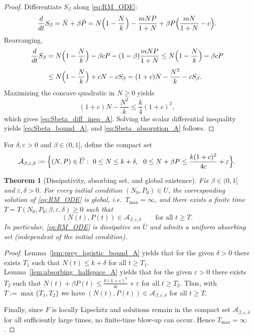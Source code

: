 \documentclass[pdflatex,sn-mathphys-ay]{sn-jnl}
\theoremstyle{thmstyleone}
\newtheorem{theorem}{Theorem}[section]
\theoremstyle{definition}
\theoremstyle{remark}
\begin{document}
\begin{proof}
Differentiate $S_\beta$ along \eqref{eq:RM_ODE}:
\[
\frac{d}{dt}S_\beta
=\dot N+\beta \dot P
= N\Bigl(1-\frac{N}{k}\Bigr)-\frac{mNP}{1+N}+\beta P\Bigl(\frac{mN}{1+N}-c\Bigr).
\]
Rearranging,
\begin{align*}
\frac{d}{dt}S_\beta
&= N\Bigl(1-\frac{N}{k}\Bigr)-\beta cP-(1-\beta)\frac{mNP}{1+N}
\le N\Bigl(1-\frac{N}{k}\Bigr)-\beta cP \\[4pt]
&\le N\Bigl(1-\frac{N}{k}\Bigr)+cN-cS_\beta
=(1+c)N-\frac{N^2}{k}-cS_\beta.
\end{align*}
Maximizing the concave quadratic in $N\ge 0$ yields
\[
(1+c)N-\frac{N^2}{k}\le \frac{k}{4}(1+c)^2,
\]
which gives \eqref{eq:Sbeta_diff_ineq_A}. Solving the scalar differential inequality yields \eqref{eq:Sbeta_bound_A},
and \eqref{eq:Sbeta_absorption_A} follows.
\end{proof}

For $\delta,\varepsilon>0$ and $\beta\in(0,1]$, define the compact set
\begin{equation}\label{eq:absorbing_set_def_A}
\mathcal A_{\beta,\varepsilon,\delta}
:=\Bigl\{(N,P)\in\overline U:\ 0\le N\le k+\delta,\ \ 0\le N+\beta P\le \frac{k(1+c)^2}{4c}+\varepsilon\Bigr\}.
\end{equation}

\begin{theorem}[Dissipativity, absorbing set, and global existence]\label{thm:absorbing_set_global_A}
Fix $\beta\in(0,1]$ and $\varepsilon,\delta>0$. For every initial condition $(N_0,P_0)\in\overline U$, the
corresponding solution of \eqref{eq:RM_ODE} is global, i.e.\ $T_{\max}=\infty$, and there exists a finite time
$T=T(N_0,P_0;\beta,\varepsilon,\delta)\ge 0$ such that
\[
(N(t),P(t))\in \mathcal A_{\beta,\varepsilon,\delta}
\qquad\text{for all }t\ge T.
\]
In particular, \eqref{eq:RM_ODE} is dissipative on $\overline U$ and admits a uniform absorbing set
(independent of the initial condition).
\end{theorem}

\begin{proof}
Lemma~\ref{lem:prey_logistic_bound_A} yields that for the given $\delta>0$ there exists $T_1$ such that
$N(t)\le k+\delta$ for all $t\ge T_1$.
Lemma~\ref{lem:absorbing_halfspace_A} yields that for the given $\varepsilon>0$ there exists $T_2$ such that
$N(t)+\beta P(t)\le \frac{k(1+c)^2}{4c}+\varepsilon$ for all $t\ge T_2$.
Thus, with $T:=\max\{T_1,T_2\}$ we have $(N(t),P(t))\in \mathcal A_{\beta,\varepsilon,\delta}$ for all $t\ge T$.

Finally, since $F$ is locally Lipschitz and solutions remain in the compact set $\mathcal A_{\beta,\varepsilon,\delta}$
for all sufficiently large times, no finite-time blow-up can occur. Hence $T_{\max}=\infty$.
\end{proof}
\end{document}
